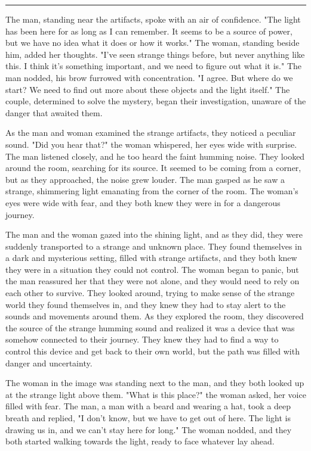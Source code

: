 \documentclass[smalldemyvopaper,11pt,twoside,onecolumn,openright,extrafontsizes]{memoir}
\begin{document}
\fancybreak{* * *}
The man, standing near the artifacts, spoke with an air of confidence. "The light has been here for as long as I can remember. It seems to be a source of power, but we have no idea what it does or how it works." The woman, standing beside him, added her thoughts. "I've seen strange things before, but never anything like this. I think it's something important, and we need to figure out what it is." The man nodded, his brow furrowed with concentration. "I agree. But where do we start? We need to find out more about these objects and the light itself." The couple, determined to solve the mystery, began their investigation, unaware of the danger that awaited them.\par
As the man and woman examined the strange artifacts, they noticed a peculiar sound. "Did you hear that?" the woman whispered, her eyes wide with surprise. The man listened closely, and he too heard the faint humming noise. They looked around the room, searching for its source. It seemed to be coming from a corner, but as they approached, the noise grew louder. The man gasped as he saw a strange, shimmering light emanating from the corner of the room. The woman's eyes were wide with fear, and they both knew they were in for a dangerous journey.\par
The man and the woman gazed into the shining light, and as they did, they were suddenly transported to a strange and unknown place. They found themselves in a dark and mysterious setting, filled with strange artifacts, and they both knew they were in a situation they could not control. The woman began to panic, but the man reassured her that they were not alone, and they would need to rely on each other to survive. They looked around, trying to make sense of the strange world they found themselves in, and they knew they had to stay alert to the sounds and movements around them. As they explored the room, they discovered the source of the strange humming sound and realized it was a device that was somehow connected to their journey. They knew they had to find a way to control this device and get back to their own world, but the path was filled with danger and uncertainty.\par
The woman in the image was standing next to the man, and they both looked up at the strange light above them. "What is this place?" the woman asked, her voice filled with fear. The man, a man with a beard and wearing a hat, took a deep breath and replied, "I don't know, but we have to get out of here. The light is drawing us in, and we can't stay here for long." The woman nodded, and they both started walking towards the light, ready to face whatever lay ahead.\par
\end{document}
